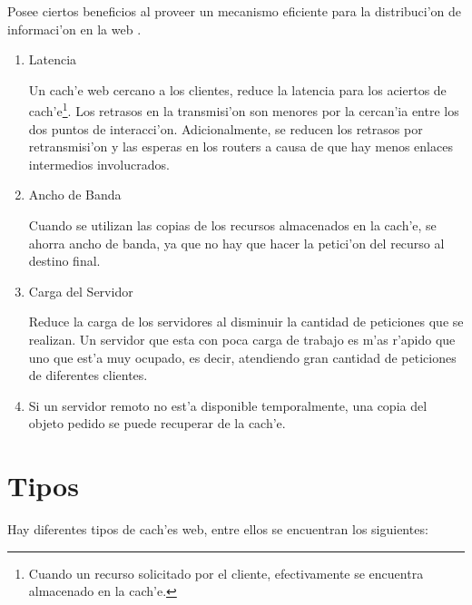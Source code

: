 Posee ciertos beneficios al proveer un mecanismo eficiente para la distribuci'on de informaci'on en la web \citep[p. 20]{webCaching}.
\begin{enumerate}
\item Latencia

Un cach'e web cercano a los clientes, reduce la latencia para los aciertos de cach'e\footnote{Cuando un recurso solicitado por el cliente, efectivamente se encuentra almacenado en la cach'e.}. Los retrasos en la transmisi'on son menores por la cercan'ia entre los dos puntos de interacci'on. Adicionalmente, se reducen los retrasos por retransmisi'on y las esperas en los routers a causa de que hay menos enlaces intermedios involucrados.
\item Ancho de Banda

Cuando se utilizan las copias de los recursos almacenados en la cach'e, se ahorra ancho de banda, ya que no hay que hacer la petici'on del recurso al destino final.
\item Carga del Servidor

Reduce la carga de los servidores al disminuir la cantidad de peticiones que se realizan. Un servidor que esta con poca carga de trabajo es m'as r'apido que uno que est'a muy ocupado, es decir, atendiendo gran cantidad de peticiones de diferentes clientes.

\item Si un servidor remoto no est'a disponible temporalmente, una copia del objeto pedido se puede recuperar de la cach'e.
\end{enumerate}

\section{Tipos}

Hay diferentes tipos de cach'es web, entre ellos se encuentran los siguientes:

